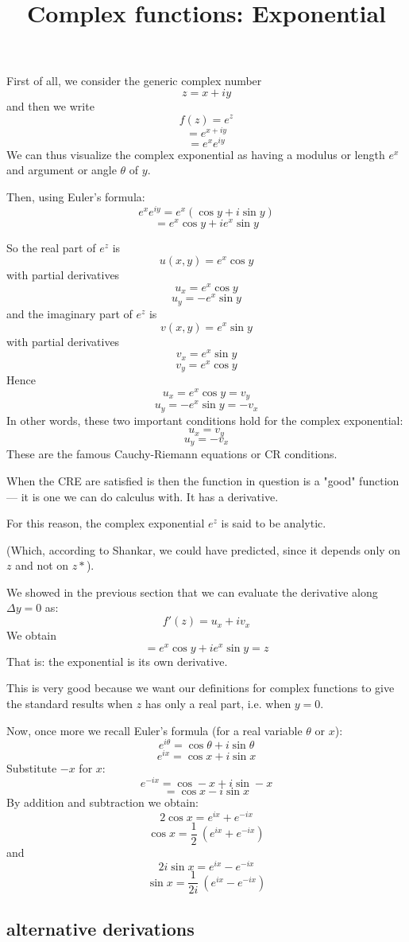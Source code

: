 \documentclass[11pt, oneside]{article}   	%
\title{Complex functions:  Exponential}
\date{}							%
\begin{document}
\maketitle
\Large
First of all, we consider the generic complex number
\[ z = x + iy \]
and then we write
\[ f(z) = e^z \]
\[ = e^{x + iy} \]
\[ = e^x e^{iy} \]
We can thus visualize the complex exponential as having a modulus or length $e^x$ and argument or angle $\theta$ of $y$.

Then, using Euler's formula:
\[ e^x e^{iy} = e^x (\cos y + i \sin y) \]
\[ = e^x \cos y + i e^x \sin y \]

So the real part of $e^z$ is 
\[ u(x,y) = e^x \cos y \]
with partial derivatives
\[ u_x = e^x \cos y \]
\[ u_y = - e^x \sin y \]
and the imaginary part of $e^z$ is 
\[ v(x,y) = e^x \sin y \]
with partial derivatives
\[ v_x = e^x \sin y \]
\[ v_y = e^x \cos y \]
Hence
\[ u_x = e^x \cos y = v_y \]
\[ u_y = - e^x \sin y = - v_x \]
In other words, these two important conditions hold for the complex exponential:
\[ u_x = v_y \]
\[ u_y = - v_x \]
These are the famous Cauchy-Riemann equations or CR conditions.  

When the CRE are satisfied is then the function in question is a "good" function --- it is one we can do calculus with.  It has a derivative.

For this reason, the complex exponential $e^z$ is said to be analytic. 

(Which, according to Shankar, we could have predicted, since it depends only on $z$ and not on $z*$).

We showed in the previous section that we can evaluate the derivative along $\Delta y =0$ as:
\[ f'(z) = u_x + iv_x  \]
We obtain
\[ = e^x \cos y + i e^x \sin y = z \]
That is:  the exponential is its own derivative.

This is very good because we want our definitions for complex functions to give the standard results when $z$ has only a real part, i.e. when $y=0$.

Now, once more we recall Euler's formula (for a real variable $\theta$ or $x$):
\[ e^{i \theta} = \cos \theta + i \sin \theta \]
\[ e^{i x} = \cos x + i \sin x \]
Substitute $-x$ for $x$:
\[ e^{-i x} = \cos -x + i \sin -x \]
\[ = \cos x - i \sin x \]
By addition and subtraction we obtain:
\[ 2 \cos x = e^{i x} + e^{-i x} \]
\[ \cos x = \frac{1}{2} \ (e^{i x} + e^{-i x}) \]
and
\[ 2i \sin x = e^{i x} - e^{-i x} \]
\[ \sin x = \frac{1}{2i} \ (e^{i x} - e^{-i x}) \]

\subsection*{alternative derivations}
\end{document}
